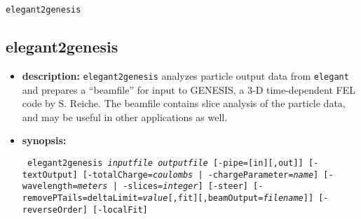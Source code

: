 \newpage
\begin{center}{\Large\verb|elegant2genesis|}\end{center}
\subsection{elegant2genesis}
\label{elegant2genesis}

\begin{itemize}
\item {\bf description:}
\verb|elegant2genesis| analyzes particle output data from \verb|elegant| and prepares
a ``beamfile'' for input to GENESIS\cite{GENESIS}, a 3-D time-dependent FEL code by 
S. Reiche.  The beamfile contains slice analysis of the particle data, and may be
useful in other applications as well.

\item {\bf synopsis:}
\begin{flushleft}{\tt
elegant2genesis {\em inputfile} {\em outputfile} 
[-pipe=[in][,out]] [-textOutput]
[-totalCharge={\em coulombs} | -chargeParameter={\em name}]
[-wavelength={\em meters} | -slices={\em integer}]
[-steer] [-removePTails=deltaLimit={\em value}[,fit][,beamOutput={\em filename}]]
[-reverseOrder] [-localFit]
}\end{flushleft}


\end{itemize}
